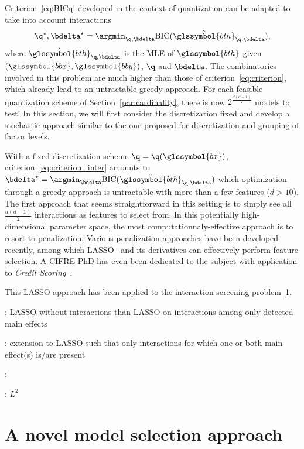 Criterion~\eqref{eq:BICq} developed in the context of quantization can be adapted to take into account interactions
\begin{equation}\label{eq:criterion_inter}
\q^\star,\bdelta^\star = \argmin_{\q,\bdelta} \text{BIC}(\hat{\glssymbol{bth}}_{\q,\bdelta}),
\end{equation}
where $\hat{\glssymbol{bth}}_{\q,\bdelta}$ is the MLE of $\glssymbol{bth}$ given $(\glssymbol{bbx},\glssymbol{bby})$, $\q$ and $\bdelta$. The combinatorics involved in this problem are much higher than those of criterion~\eqref{eq:criterion}, which already lead to an untractable greedy approach. For each feasible quantization scheme of Section~\ref{par:cardinality}, there is now $2^{\frac{d(d-1)}{2}}$ models to test! In this section, we will first consider the discretization fixed and develop a stochastic approach similar to the one proposed for discretization and grouping of factor levels.

With a fixed discretization scheme $\q = \q(\glssymbol{bx})$, criterion~\ref{eq:criterion_inter} amounts to $\bdelta^\star = \argmin_{\bdelta} \text{BIC}(\hat{\glssymbol{bth}}_{\q,\bdelta})$ which optimization through a greedy approach is untractable with more than a few features ($d > 10$). The first approach that seems straightforward in this setting is to simply see all $\frac{d(d-1)}{2}$ interactions as features to select from. In this potentially high-dimensional parameter space, the most computationnaly-effective approach is to resort to penalization. Various penalization approaches have been developed recently, among which LASSO~\cite{tibshirani1996regression} and its derivatives can effectively perform feature selection. A CIFRE PhD has even been dedicated to the subject with application to \textit{Credit Scoring}~\cite{vital2016}.

This LASSO approach has been applied to the interaction screening problem~\ref{}.


\cite{wu2009genome} : LASSO without interactions than LASSO on interactions among only detected main effects

\cite{bien2013lasso} : extension to LASSO such that only interactions for which one or both main effect(s) is/are present

\cite{wang2012interaction} : 

\cite{park2007penalized} : $L^2$

\section{A novel model selection approach}

